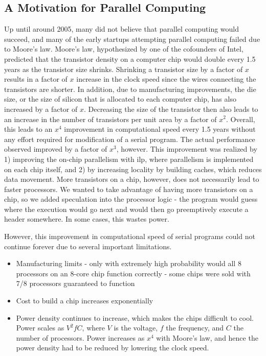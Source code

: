 \documentclass[10pt]{article}
\begin{document}
\begin{flushleft}
\section{A Motivation for Parallel Computing}

Up until around 2005, many did not believe that parallel computing would succeed, and many of the early startups attempting parallel computing failed due to Moore's law. Moore's law, hypothesized by one of the cofounders of Intel, predicted that the transistor density on a computer chip would double every 1.5 years as the transistor size shrinks. Shrinking a transistor size by a factor of \(x\) results in a factor of \(x\) increase in the clock speed since the wires connecting the transistors are shorter. In addition, due to manufacturing improvements, the die size, or the size of silicon that is allocated to each computer chip, has also increased by a factor of \(x\). Decreasing the size of the transistor then also leads to an increase in the number of transistors per unit area by a factor of \(x^2\). Overall, this leads to an \(x^4\) improvement in computational speed every 1.5 years without any effort required for modification of a serial program. The actual performance observed improved by a factor of \(x^3\), however. This improvement was realized by 1) improving the on-chip parallelism with \gls{ilp}, where parallelism is implemented on each chip itself, and 2) by increasing locality by building caches, which reduces data movement. More transistors on a chip, however, does not necessarily lead to faster processors. We wanted to take advantage of having more transistors on a chip, so we added speculation into the processor logic - the program would guess where the execution would go next and would then go preemptively execute a header somewhere. In some cases, this wastes power.

However, this improvement in computational speed of serial programs could not continue forever due to several important limitations.

\begin{itemize}
\item Manufacturing limits - only with extremely high probability would all 8 processors on an 8-core chip function correctly - some chips were sold with 7/8 processors guaranteed to function
\item Cost to build a chip increases exponentially
\item Power density continues to increase, which makes the chips difficult to cool. Power scales as \(V^2fC\), where \(V\) is the voltage, \(f\) the frequency, and \(C\) the number of processors. Power increases as \(x^4\) with Moore's law, and hence the power density had to be reduced by lowering the clock speed.
\end{itemize}


\end{flushleft}
\end{document}
